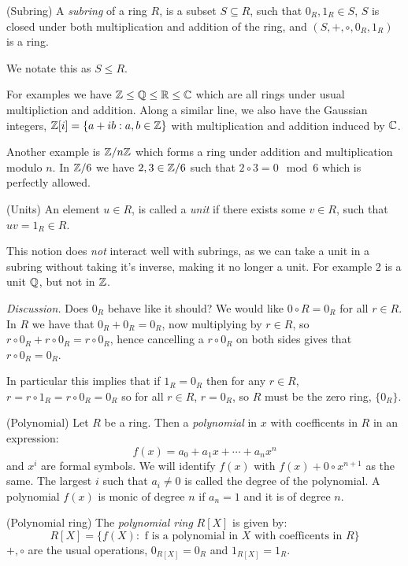 \documentclass{article}
\begin{document}
\begin{definition}
	(Subring) A \textit{subring} of a ring $ R $, is a subset $ S\subseteq R $, such that $ 0_R,1_R\in S $, $ S $ is closed under both multiplication and addition of the ring, and $ (S,+,\circ, 0_R,1_R) $ is a ring. 
\end{definition}
We notate this as $ S\le R $.\par
For examples we have $ \mathbb{Z}\le\mathbb{Q}\le\mathbb{R}\le\mathbb{C} $ which are all rings under usual multipliction and addition. Along a similar line, we also have the Gaussian integers, $ \mathbb{Z}[i]=\{a+ib:a,b\in \mathbb{Z}\} $ with multiplication and addition induced by $ \mathbb{C} $.\par
Another example is $ \mathbb{Z}/n\mathbb{Z} $ which forms a ring under addition and multiplication modulo $ n $. In $ \mathbb{Z}/6 $ we have $ 2, 3\in \mathbb{Z}/6 $ such that $ 2\circ 3=0\mod 6 $ which is perfectly allowed.

\begin{definition}
	(Units) An element $ u\in R $, is called a \textit{unit} if there exists some $ v\in R $, such that $ uv=1_R\in R $.
\end{definition}
This notion does \textit{not} interact well with subrings, as we can take a unit in a subring without taking it's inverse, making it no longer a unit. For example 2 is a unit $ \mathbb{Q} $, but not in $ \mathbb{Z} $.
\par\textit{Discussion.} Does $ 0_R $ behave like it should? We would like $ 0\circ R=0_R $ for all $ r\in R $. In $ R $ we have that $ 0_R+0_R =0_R $, now multiplying by $ r\in R $, so $ r\circ 0_R+r\circ 0_R=r\circ 0_R $, hence cancelling a $ r\circ 0_R $ on both sides gives that $ r\circ 0_R=0_R $.\par
In particular this implies that if $ 1_R=0_R $ then for any $ r\in R $, $ r=r\circ 1_R=r\circ 0_R=0_R $ so for all $ r\in R $, $ r=0_R $, so $ R $ must be the zero ring, $ \{0_R\} $.\par

\begin{definition}
	(Polynomial) Let $ R $ be a ring. Then a \textit{polynomial} in $ x $ with coefficents in $ R $ in an expression:
	\[
		f(x)=a_0+a_1x+\cdots+a_nx^n
	\]
	and $ x^i $ are formal symbols. We will identify $ f(x) $ with $ f(x)+0\circ x^{n+1} $ as the same. The largest $ i $ such that $ a_i \ne 0$ is called the degree of the polynomial. A polynomial $ f(x) $ is monic of degree $ n $ if $ a_n=1 $ and it is of degree $ n $.
\end{definition} 
\begin{definition}
	(Polynomial ring) The \textit{polynomial ring} $ R[X] $ is given by:
	\[
		R[X]= \{f(X): \text{ f is a polynomial in } X \text { with coefficents in } R\}
	\]
	$+, \circ  $ are the usual operations, $ 0_{R[X]}=0_R $ and $ 1_{R[X]}=1_R $.
\end{definition}
\end{document}
